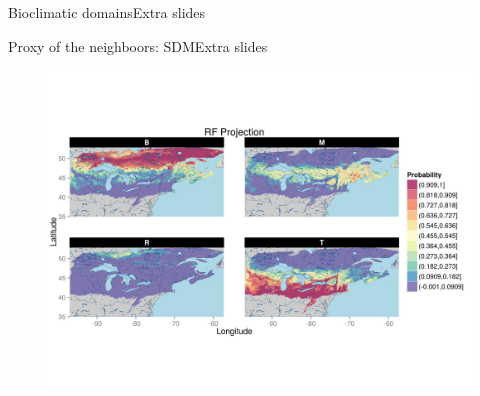 \documentclass[10pt,aspectratio=149]{beamer}
\begin{document}
\begin{frame}{Bioclimatic domains}{Extra slides}
\end{frame}


\begin{frame}{Proxy of the neighboors: SDM}{Extra slides}

		\begin{figure}
			\vspace{-5em}
			\includegraphics[height=1\paperheight]{Figs/RF_proj_SDM.jpg}
		\end{figure}

\end{frame}
\end{document}
